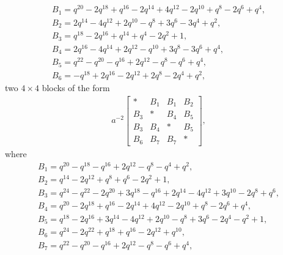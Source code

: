 \documentclass[10pt,a4paper]{amsart}
\numberwithin{equation}{section}
\theoremstyle{definition}
\newcommand{\flac}[2]{#1}
\begin{document}
\begin{gather*}
 B_1 =
\flac{q^{20}}{a^2}-\flac{2q^{18}}{a^2}+\flac{q^{16}}{a^2}-\flac{2q^{14}}{a^2}+\flac{4q^{12}}{a^2}-\flac{2q^{10}}{a^2}+\flac{q^{8}}{a^2}-\flac{2q^{6}}{a^2}+\flac{q^{4}}{a^2}, \\
 B_2 =
\flac{2q^{14}}{a^2}-\flac{4q^{12}}{a^2}+\flac{2q^{10}}{a^2}-\flac{q^{8}}{a^2}+\flac{3q^{6}}{a^2}-\flac{3q^{4}}{a^2}+\flac{q^{2}}{a^2}, \\
 B_3 =
\flac{q^{18}}{a^2}-\flac{2q^{16}}{a^2}+\flac{q^{14}}{a^2}+\flac{q^{4}}{a^2}-\flac{2q^{2}}{a^2}+\flac{1}{a^2}, \\
 B_4 =
\flac{2q^{16}}{a^2}-\flac{4q^{14}}{a^2}+\flac{2q^{12}}{a^2}-\flac{q^{10}}{a^2}+\flac{3q^{8}}{a^2}-\flac{3q^{6}}{a^2}+\flac{q^{4}}{a^2}, \\
 B_5 =
\flac{q^{22}}{a^2}-\flac{q^{20}}{a^2}-\flac{q^{16}}{a^2}+\flac{2q^{12}}{a^2}-\flac{q^{8}}{a^2}-\flac{q^{6}}{a^2}+\flac{q^{4}}{a^2}, \\
 B_6 =
-\flac{q^{18}}{a^2}+\flac{2q^{16}}{a^2}-\flac{2q^{12}}{a^2}+\flac{2q^{8}}{a^2}-\flac{2q^{4}}{a^2}+\flac{q^{2}}{a^2},
\end{gather*}
two $4 \times 4$ blocks of the form
\begin{align*}
 a^{-2} \begin{bmatrix}
 * & B_1 & B_1 & B_2 \\
 B_3 & * & B_4 & B_5 \\
 B_3 & B_4 & * & B_5 \\
 B_6 & B_7 & B_7 & *
 \end{bmatrix},
\end{align*}
where
\begin{gather*}
 B_1 =
\flac{q^{20}}{a^2}-\flac{q^{18}}{a^2}-\flac{q^{16}}{a^2}+\flac{2q^{12}}{a^2}-\flac{q^{8}}{a^2}-\flac{q^{4}}{a^2}+\flac{q^{2}}{a^2}, \\
 B_2 =
\flac{q^{14}}{a^2}-\flac{2q^{12}}{a^2}+\flac{q^{8}}{a^2}+\flac{q^{6}}{a^2}-\flac{2q^{2}}{a^2}+\flac{1}{a^2}, \\
 B_3 =
\flac{q^{24}}{a^2}-\flac{q^{22}}{a^2}-\flac{2q^{20}}{a^2}+\flac{3q^{18}}{a^2}-\flac{q^{16}}{a^2}+\flac{2q^{14}}{a^2}-\flac{4q^{12}}{a^2}+\flac{3q^{10}}{a^2}-\flac{2q^{8}}{a^2}+\flac{q^{6}}{a^2}, \\
 B_4 =
\flac{q^{20}}{a^2}-\flac{2q^{18}}{a^2}+\flac{q^{16}}{a^2}-\flac{2q^{14}}{a^2}+\flac{4q^{12}}{a^2}-\flac{2q^{10}}{a^2}+\flac{q^{8}}{a^2}-\flac{2q^{6}}{a^2}+\flac{q^{4}}{a^2},\\
 B_5 =
\flac{q^{18}}{a^2}-\flac{2q^{16}}{a^2}+\flac{3q^{14}}{a^2}-\flac{4q^{12}}{a^2}+\flac{2q^{10}}{a^2}-\flac{q^{8}}{a^2}+\flac{3q^{6}}{a^2}-\flac{2q^{4}}{a^2}-\flac{q^{2}}{a^2}+\flac{1}{a^2}, \\
 B_6 =
\flac{q^{24}}{a^2}-\flac{2q^{22}}{a^2}+\flac{q^{18}}{a^2}+\flac{q^{16}}{a^2}-\flac{2q^{12}}{a^2}+\flac{q^{10}}{a^2}, \\
 B_7 =
\flac{q^{22}}{a^2}-\flac{q^{20}}{a^2}-\flac{q^{16}}{a^2}+\flac{2q^{12}}{a^2}-\flac{q^{8}}{a^2}-\flac{q^{6}}{a^2}+\flac{q^{4}}{a^2},
\end{gather*}
\end{document}

